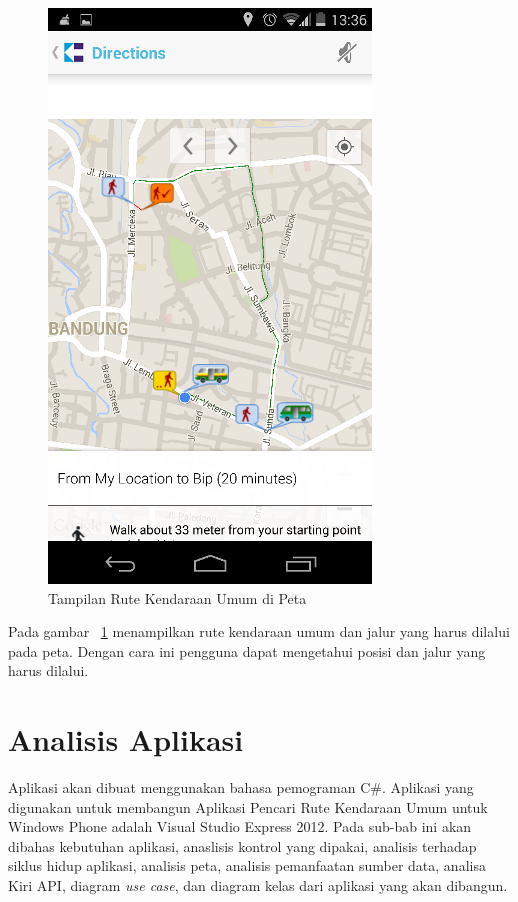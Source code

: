 \begin{figure}[h]
	\centering
		\includegraphics[scale=0.5]{Gambar/KIRI_Android/tampilan_peta}
	\caption{Tampilan Rute Kendaraan Umum di Peta}
	\label{fig:peta}
\end{figure}
\newpage
Pada gambar ~\ref{fig:peta} menampilkan rute kendaraan umum dan jalur yang harus dilalui pada peta. Dengan cara ini pengguna dapat mengetahui posisi dan jalur yang harus dilalui.


\section{Analisis Aplikasi}
\label{lab:Analisis Aplikasi}
\hspace{0.5cm} Aplikasi akan dibuat menggunakan bahasa pemograman C\#. Aplikasi yang digunakan untuk membangun Aplikasi Pencari Rute Kendaraan Umum untuk Windows Phone adalah Visual Studio Express 2012. Pada sub-bab ini akan dibahas kebutuhan aplikasi, anaslisis kontrol yang dipakai, analisis terhadap siklus hidup aplikasi, analisis peta, analisis pemanfaatan sumber data, analisa Kiri API, diagram \textit{use case}, dan diagram kelas dari aplikasi yang akan dibangun. 

